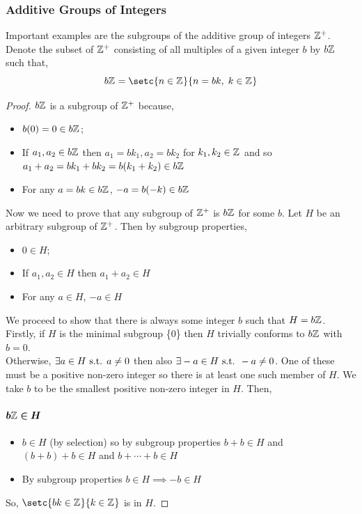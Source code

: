 \documentclass[MathsNotesBase.tex]{subfiles}
\begin{document}
{		\subsubsection{Additive Groups of Integers}
		Important examples are the subgroups of the additive group of integers $\mathbb{Z}^{+}$. Denote the subset of $\mathbb{Z}^{+}$ consisting of all multiples of a given integer $b$ by $b\mathbb{Z}^{}$ such that,
		\[ b\Z{} = \setc{n \in \Z{}}{n = bk,\; k \in \Z{}} \]
		\begin{proof}
			$b\mathbb{Z}^{}$ is a subgroup of $\mathbb{Z}^{+}$ because,
			\begin{itemize}
				\item{$b(0) = 0 \in b\mathbb{Z}^{}$;}
				\item{If $a_1,a_2 \in b\mathbb{Z}^{}$ then $a_1 = bk_1, a_2 = bk_2$ for $k_1, k_2 \in \mathbb{Z}^{}$ and so $a_1 + a_2 = bk_1 + bk_2 = b(k_1 + k_2) \in b\mathbb{Z}^{}$}
				\item{For any $a = bk \in b\mathbb{Z}^{}$, $-a = b(-k) \in b\mathbb{Z}^{}$}
			\end{itemize}
			Now we need to prove that any subgroup of $\mathbb{Z}^{+}$ is $b\mathbb{Z}^{}$ for some $b$. Let $H$ be an arbitrary subgroup of $\mathbb{Z}^{+}$. Then by subgroup properties,
			\begin{itemize}
				\item{$0 \in H$;}
				\item{If $a_1,a_2 \in H$ then $a_1 + a_2 \in H$}
				\item{For any $a \in H$, $-a \in H$}
			\end{itemize}
			We proceed to show that there is always some integer $b$ such that $H = b\mathbb{Z}^{}$.\\
			Firstly, if $H$ is the minimal subgroup \{0\} then $H$ trivially conforms to $b\mathbb{Z}^{}$ with $b = 0$.\\
			Otherwise, $\exists a \in H \text{ s.t. } a \neq 0$ then also $\exists -a \in H \text{ s.t. } -a \neq 0$. One of these must be a positive non-zero integer so there is at least one such member of $H$. We take $b$ to be the smallest positive non-zero integer in $H$. Then,
			\paragraph{$\bm{b\mathbb{Z}^{} \in H}$}
			\begin{itemize}
				\item{$b \in H$ (by selection) so by subgroup properties $b + b \in H$ and $(b + b) + b \in H$ and $b + \cdots + b \in H$}
				\item{By subgroup properties $b \in H \implies -b \in H$}
			\end{itemize}
			So, $\setc{bk \in \Z{}}{k \in \Z{}}$ is in $H$.

\end{proof}}
\end{document}
